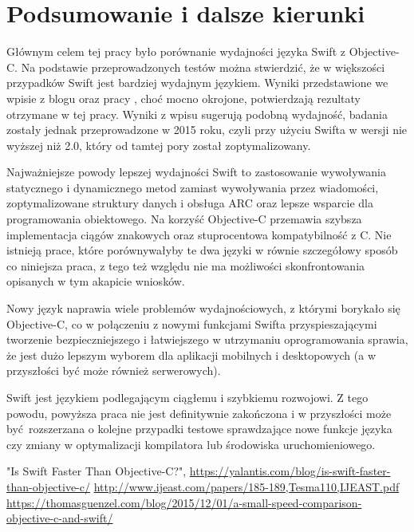 \documentclass[mgr, shortabstract]{iithesis}
\begin{document}
\chapter{Podsumowanie i dalsze kierunki}

Głównym celem tej pracy było porównanie wydajności języka Swift z Objective-C. Na podstawie przeprowadzonych testów można stwierdzić, że w większości przypadków Swift jest bardziej wydajnym językiem. Wyniki przedstawione we wpisie z blogu \cite{yalantis} oraz pracy \cite{ijeast}, choć mocno okrojone, potwierdzają rezultaty otrzymane w tej pracy. Wyniki z wpisu \cite{gunzel} sugerują podobną wydajność, badania zostały jednak przeprowadzone w 2015 roku, czyli przy użyciu Swifta w wersji nie wyższej niż 2.0, który od tamtej pory został zoptymalizowany.

Najważniejsze powody lepszej wydajności Swift to zastosowanie wywoływania statycznego i dynamicznego metod zamiast wywoływania przez wiadomości, zoptymalizowane struktury danych i obsługa ARC oraz lepsze wsparcie dla programowania obiektowego. Na korzyść Objective-C przemawia szybsza implementacja ciągów znakowych oraz stuprocentowa kompatybilność z C. Nie istnieją prace, które porównywałyby te dwa języki w równie szczegółowy sposób co niniejsza praca, z tego też względu nie ma możliwości skonfrontowania opisanych w tym akapicie wniosków. 

Nowy język naprawia wiele problemów wydajnościowych, z którymi borykało się Objective-C, co w połączeniu z nowymi funkcjami Swifta przyspieszającymi tworzenie bezpieczniejszego i łatwiejszego w utrzymaniu oprogramowania sprawia, że jest dużo lepszym wyborem dla aplikacji mobilnych i desktopowych (a w przyszłości być może również serwerowych).
 
Swift jest językiem podlegającym ciągłemu i szybkiemu rozwojowi. Z tego powodu, powyższa praca nie jest definitywnie zakończona i w przyszłości może być rozszerzana o kolejne przypadki testowe sprawdzające nowe funkcje języka czy zmiany w optymalizacji kompilatora lub środowiska uruchomieniowego.


\begin{thebibliography}{1}
 "Is Swift Faster Than Objective-C?", \url{https://yalantis.com/blog/is-swift-faster-than-objective-c/}
 \url{http://www.ijeast.com/papers/185-189,Tesma110,IJEAST.pdf}
 \url{https://thomasguenzel.com/blog/2015/12/01/a-small-speed-comparison-objective-c-and-swift/}
\end{thebibliography}                                                                                                                                                          
\end{document}
